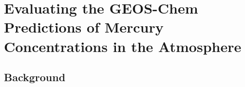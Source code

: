 \chapter{Evaluating the GEOS-Chem Predictions of Mercury Concentrations in the Atmosphere }
\section{Background}


